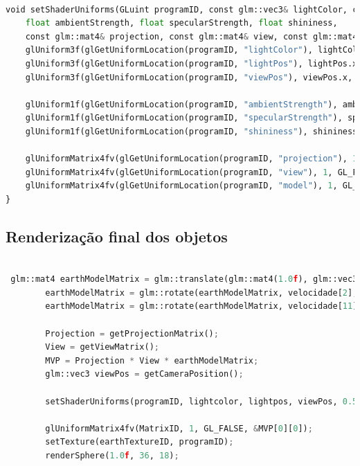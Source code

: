 \documentclass[12pt,a4paper]{memoir}
\begin{document}
\begin{lstlisting}[language=Python, caption=Função que atribui a luz aos objetos]

void setShaderUniforms(GLuint programID, const glm::vec3& lightColor, const glm::vec3& lightPos, const glm::vec3& viewPos,
    float ambientStrength, float specularStrength, float shininess,
    const glm::mat4& projection, const glm::mat4& view, const glm::mat4& model) {
    glUniform3f(glGetUniformLocation(programID, "lightColor"), lightColor.r, lightColor.g, lightColor.b);
    glUniform3f(glGetUniformLocation(programID, "lightPos"), lightPos.x, lightPos.y, lightPos.z);
    glUniform3f(glGetUniformLocation(programID, "viewPos"), viewPos.x, viewPos.y, viewPos.z);

    glUniform1f(glGetUniformLocation(programID, "ambientStrength"), ambientStrength);
    glUniform1f(glGetUniformLocation(programID, "specularStrength"), specularStrength);
    glUniform1f(glGetUniformLocation(programID, "shininess"), shininess);

    glUniformMatrix4fv(glGetUniformLocation(programID, "projection"), 1, GL_FALSE, &projection[0][0]);
    glUniformMatrix4fv(glGetUniformLocation(programID, "view"), 1, GL_FALSE, &view[0][0]);
    glUniformMatrix4fv(glGetUniformLocation(programID, "model"), 1, GL_FALSE, &model[0][0]);
}

    \end{lstlisting}

\newpage

\subsection{Renderização final dos objetos}

\begin{lstlisting}[language=Python, caption=Renderização da Terra]

 glm::mat4 earthModelMatrix = glm::translate(glm::mat4(1.0f), glm::vec3(x[2], 0.0f, y[2]));
        earthModelMatrix = glm::rotate(earthModelMatrix, velocidade[2], glm::vec3(0.0f, 1.0f, 0.0f));
        earthModelMatrix = glm::rotate(earthModelMatrix, velocidade[11], glm::vec3(1.0f, 0.0f, 0.0f));

        Projection = getProjectionMatrix();
        View = getViewMatrix();
        MVP = Projection * View * earthModelMatrix;
        glm::vec3 viewPos = getCameraPosition();

        setShaderUniforms(programID, lightcolor, lightpos, viewPos, 0.5f, 0.5f, 3.0f, Projection, View, earthModelMatrix);

        glUniformMatrix4fv(MatrixID, 1, GL_FALSE, &MVP[0][0]);
        setTexture(earthTextureID, programID);
        renderSphere(1.0f, 36, 18);


\end{lstlisting}
\end{document}

